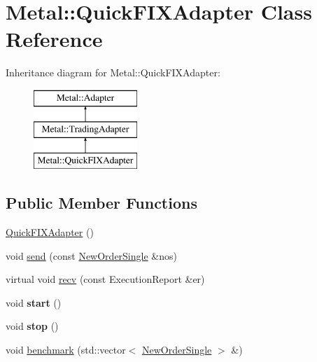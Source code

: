 \hypertarget{classMetal_1_1QuickFIXAdapter}{}\section{Metal\+:\+:Quick\+F\+I\+X\+Adapter Class Reference}
\label{classMetal_1_1QuickFIXAdapter}
Inheritance diagram for Metal\+:\+:Quick\+F\+I\+X\+Adapter\+:\begin{figure}[H]
\begin{center}
\leavevmode
\includegraphics[height=3.000000cm]{classMetal_1_1QuickFIXAdapter}
\end{center}
\end{figure}
\subsection*{Public Member Functions}
\begin{DoxyCompactItemize}
\item 
\hyperlink{classMetal_1_1QuickFIXAdapter_a7b4e19943a0a78fb0fb5a313ad422f6c}{Quick\+F\+I\+X\+Adapter} ()
\item 
void \hyperlink{classMetal_1_1QuickFIXAdapter_a41fda534ccf047aede8aea25a5bd2919}{send} (const \hyperlink{classMetal_1_1NewOrderSingle}{New\+Order\+Single} \&nos)
\item 
virtual void \hyperlink{classMetal_1_1QuickFIXAdapter_aea22892c800300e13f546a6c0f484543}{recv} (const Execution\+Report \&er)
\item 
\hypertarget{classMetal_1_1QuickFIXAdapter_ae3edfef558c69be1285fd669f53ef939}{}void {\bfseries start} ()\label{classMetal_1_1QuickFIXAdapter_ae3edfef558c69be1285fd669f53ef939}

\item 
\hypertarget{classMetal_1_1QuickFIXAdapter_a46991507072e3b8f65d5c708b4093cad}{}void {\bfseries stop} ()\label{classMetal_1_1QuickFIXAdapter_a46991507072e3b8f65d5c708b4093cad}

\item 
void \hyperlink{classMetal_1_1QuickFIXAdapter_a90b6db7b5f7d814356aa3994c177d2df}{benchmark} (std\+::vector$<$ \hyperlink{classMetal_1_1NewOrderSingle}{New\+Order\+Single} $>$ \&)
\end{DoxyCompactItemize}
